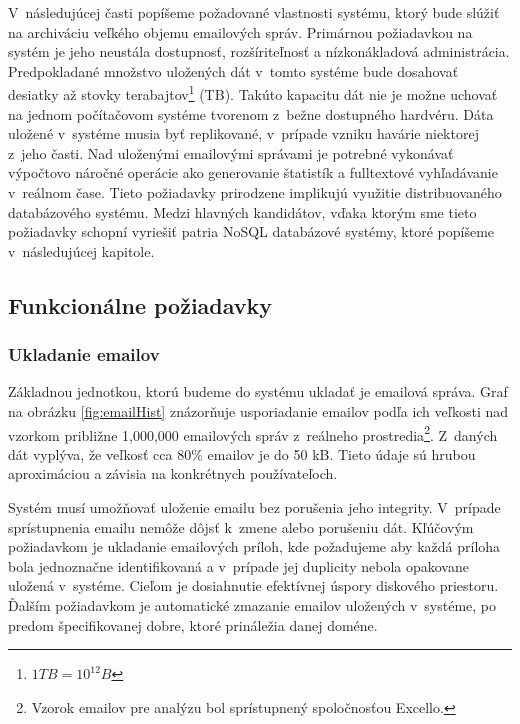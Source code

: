 \documentclass[11pt,twoside,a4paper]{book}
\begin{document}
V~následujúcej časti popíšeme požadované vlastnosti systému, ktorý bude slúžiť na archiváciu veľkého objemu emailových správ. Primárnou požiadavkou na systém je jeho neustála dostupnosť, rozšíriteľnosť a nízkonákladová administrácia. Predpokladané množstvo uložených dát v~tomto systéme bude dosahovať desiatky až stovky terabajtov\footnote{$1 TB = 10^{12} B$} (TB). Takúto kapacitu dát nie je možne uchovať na jednom počítačovom systéme tvorenom z~bežne dostupného hardvéru. Dáta uložené v~systéme musia byť replikované, v~prípade vzniku havárie niektorej z~jeho časti. Nad uloženými emailovými správami je potrebné vykonávať výpočtovo náročné operácie ako generovanie štatistík a fulltextové vyhľadávanie v~reálnom čase. Tieto požiadavky prirodzene implikujú využitie distribuovaného databázového systému. Medzi hlavných kandidátov, vďaka ktorým sme tieto požiadavky schopní vyriešiť patria NoSQL databázové systémy, ktoré popíšeme v~následujúcej kapitole.


\subsection{Funkcionálne požiadavky}

\subsubsection*{Ukladanie emailov}
Základnou jednotkou, ktorú budeme do systému ukladať je emailová správa. Graf na obrázku \ref{fig:emailHist} znázorňuje usporiadanie emailov podľa ich veľkosti nad vzorkom približne 1,000,000 emailových správ z~reálneho prostredia\footnote{Vzorok emailov pre analýzu bol sprístupnený spoločnosťou Excello.}. Z~daných dát vyplýva, že veľkosť cca 80\% emailov je do 50 kB. Tieto údaje sú hrubou aproximáciou a závisia na konkrétnych používateľoch.

Systém musí umožňovať uloženie emailu bez porušenia jeho integrity. V~prípade sprístupnenia emailu nemôže dôjsť k~zmene alebo porušeniu dát. Kľúčovým požiadavkom je ukladanie emailových príloh, kde požadujeme aby každá príloha bola jednoznačne identifikovaná a v~prípade jej duplicity nebola opakovane uložená v~systéme. Cieľom je dosiahnutie efektívnej úspory diskového priestoru. Ďalším požiadavkom je automatické zmazanie emailov uložených v~systéme, po predom špecifikovanej dobre, ktoré prináležia danej doméne.
\end{document}
